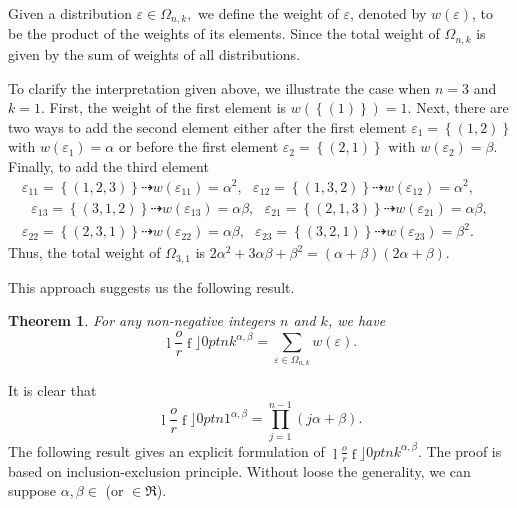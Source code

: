 \documentclass{article}
\newcommand {\lah}[2]{\genfrac\lfloor \rfloor{0pt}{}{#1}{#2}}
\newtheorem{theorem}{Theorem}
\begin{document}
Given a distribution $\varepsilon \in \Omega _{n,k},$ we define the weight
of $\varepsilon $, denoted by $w\left( \varepsilon \right) $, to be the
product of the weights of its elements. Since the total weight of $\Omega
_{n,k}$ is given by the sum of weights of all distributions.

To clarify the interpretation given above, we illustrate the case when $n=3$
and $k=1.$ First, the weight of the first element is $w\left( \left\{ \left(
1\right) \right\} \right) =1.$ Next, there are two ways to add the second
element either after the first element $\varepsilon _{1}=\left\{ \left(
1,2\right) \right\} $ with $w\left( \varepsilon _{1}\right) =\alpha $ or
before the first element $\varepsilon _{2}=\left\{ \left( 2,1\right)
\right\} $ with $w\left( \varepsilon _{2}\right) =\beta .$ Finally, to add
the third element
\begin{gather*}
\varepsilon _{11}=\left\{ \left( 1,2,3\right) \right\} \dashrightarrow
w\left( \varepsilon _{11}\right) =\alpha ^{2},\text{ \ }\varepsilon
_{12}=\left\{ \left( 1,3,2\right) \right\} \dashrightarrow w\left(
\varepsilon _{12}\right) =\alpha ^{2},\text{ } \\
\text{\ \ }\varepsilon _{13}=\left\{ \left( 3,1,2\right) \right\}
\dashrightarrow w\left( \varepsilon _{13}\right) =\alpha \beta ,\text{ \ }%
\varepsilon _{21}=\left\{ \left( 2,1,3\right) \right\} \dashrightarrow
w\left( \varepsilon _{21}\right) =\alpha \beta ,\text{ \ \ \ } \\
\varepsilon _{22}=\left\{ \left( 2,3,1\right) \right\} \dashrightarrow
w\left( \varepsilon _{22}\right) =\alpha \beta ,\text{ \ }\varepsilon
_{23}=\left\{ \left( 3,2,1\right) \right\} \dashrightarrow w\left(
\varepsilon _{23}\right) =\beta ^{2}.\text{ \ \ }
\end{gather*}%
Thus, the total weight of $\Omega _{3,1}$ is $2\alpha ^{2}+3\alpha \beta
+\beta ^{2}=\left( \alpha +\beta \right) \left( 2\alpha +\beta \right) .$

This approach suggests us the following result.
\begin{theorem}
For any non-negative integers $n$ and $k$, we have
\begin{equation}
\lah{n}{k}^{\alpha ,\beta }=\sum_{\varepsilon \in \Omega
_{n,k}}w\left( \varepsilon \right) .
\end{equation}
\end{theorem}

It is clear that%
\begin{equation}
\lah{n}{1}^{\alpha ,\beta
}=\prod\limits_{j=1}^{n-1}\left( j\alpha +\beta \right) . \label{h}
\end{equation}
The following result gives an explicit formulation of $\lah{n}{k}^{\alpha,\beta}$. The proof is based on inclusion-exclusion principle.
Without loose the generality, we can suppose $\alpha,\beta \in $ (or $\in \Re$).
\end{document}
